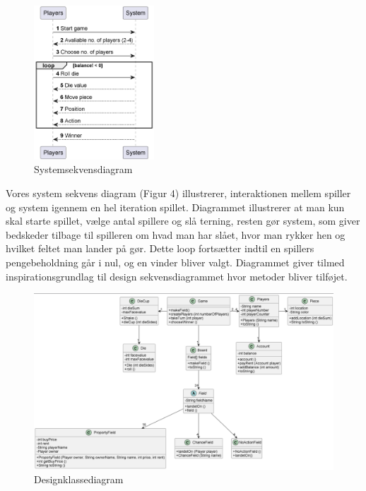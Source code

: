 \documentclass{article}
\begin{document}
\begin{figure} [h]
    \centering
    \includegraphics[width = 0.4\textwidth]{Billeder/Systemsekvensdiagram.png}
    \caption{Systemsekvensdiagram}
    \label{Systemsekvensdiagram}
\end{figure}
Vores system sekvens diagram (Figur 4) illustrerer, interaktionen mellem spiller og system igennem en hel iteration spillet. Diagrammet illustrerer at man kun skal starte spillet, vælge antal spillere og slå terning, resten gør system, som giver bedskeder tilbage til spilleren om hvad man har slået, hvor man rykker hen og hvilket feltet man lander på gør. Dette loop fortsætter indtil en spillers pengebeholdning går i nul, og en vinder bliver valgt.  Diagrammet giver  tilmed inspirationsgrundlag til design sekvensdiagrammet hvor metoder bliver tilføjet.   
\\

\begin{figure} [h]
    \centering
    \includegraphics[width = 1.0\textwidth]{Billeder/DesignKlasseDiagram.png}
    \caption{Designklassediagram}
    \label{Designklassediagram}
\end{figure}
\end{document}
